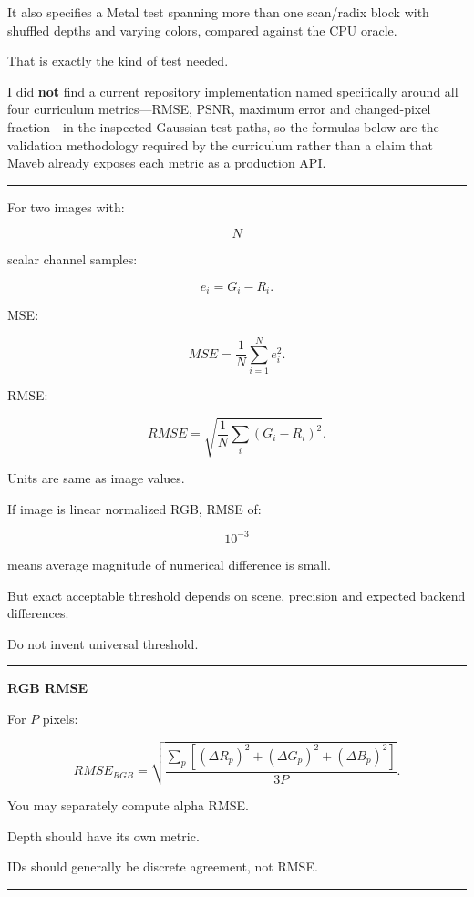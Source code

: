 It also specifies a Metal test spanning more than one scan/radix block with shuffled depths and varying colors, compared against the CPU oracle.

That is exactly the kind of test needed.

I did \textbf{not} find a current repository implementation named specifically around all four curriculum metrics---RMSE, PSNR, maximum error and changed-pixel fraction---in the inspected Gaussian test paths, so the formulas below are the validation methodology required by the curriculum rather than a claim that Maveb already exposes each metric as a production API.

\begin{center}\rule{0.5\linewidth}{0.5pt}\end{center}

For two images with:

\[
N
\]

scalar channel samples:

\[
e_i=
G_i-R_i.
\]

MSE:

\[
\boxed{
MSE=
\frac1N
\sum_{i=1}^{N}
e_i^2.
}
\]

RMSE:

\[
\boxed{
RMSE=
\sqrt{
\frac1N
\sum_i
(G_i-R_i)^2
}.
}
\]

Units are same as image values.

If image is linear normalized RGB, RMSE of:

\[
10^{-3}
\]

means average magnitude of numerical difference is small.

But exact acceptable threshold depends on scene, precision and expected backend differences.

Do not invent universal threshold.

\begin{center}\rule{0.5\linewidth}{0.5pt}\end{center}

\textbf{RGB RMSE}

For \(P\) pixels:

\[
\boxed{
RMSE_{RGB}
=
\sqrt{
\frac{
\sum_{p}
[
(\Delta R_p)^2+
(\Delta G_p)^2+
(\Delta B_p)^2
]
}{
3P
}
}.
}
\]

You may separately compute alpha RMSE.

Depth should have its own metric.

IDs should generally be discrete agreement, not RMSE.

\begin{center}\rule{0.5\linewidth}{0.5pt}\end{center}

